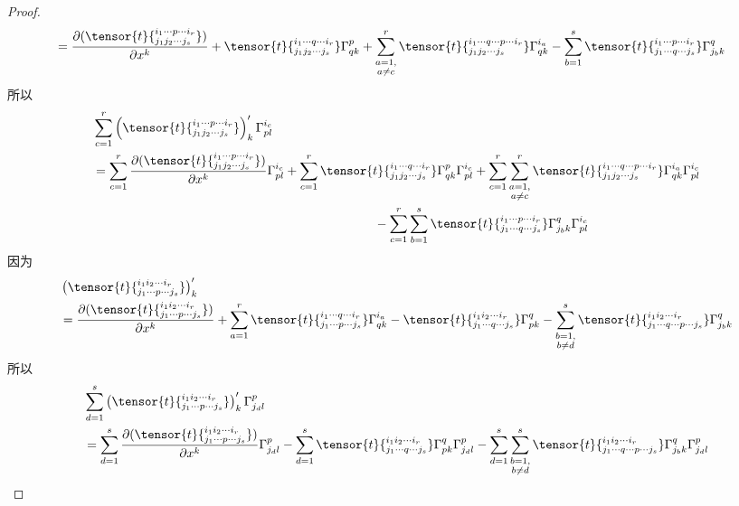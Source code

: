 \begin{proof}
\[\begin{split}
	&=\frac{{\partial}(\tensor{t}{^{i_{1}\cdots p\cdots i_{r}}_{j_{1}j_{2}\cdots j_{s}}} )}{\partial x^{k}}+\tensor{t}{^{i_{1}\cdots q\cdots i_{r}}_{j_{1}j_{2}\cdots j_{s}}} \Gamma_{qk}^{p}+\sum_{\substack{a=1,\\ a\neq c}}^{r}\tensor{t}{^{i_{1}\cdots q\cdots p\cdots i_{r}}_{j_{1}j_{2}\cdots j_{s}}}\Gamma_{qk}^{i_{a}}-\sum_{b=1}^{s}\tensor{t}{^{i_{1}\cdots p\cdots i_{r}}_{j_{1}\cdots q\cdots j_{s}}}\Gamma_{j_{b}k}^{q}
\end{split}
\]
所以
\[
\begin{split}
	&\sum_{c=1}^{r}\left( \tensor{t}{^{i_{1}\cdots p\cdots i_{r}}_{j_{1}j_{2}\cdots j_{s}}} \right)^{\prime}_{k} \Gamma_{pl}^{i_{c}}\\
	&=\sum_{c=1}^{r}\frac{{\partial}(\tensor{t}{^{i_{1}\cdots p\cdots i_{r}}_{j_{1}j_{2}\cdots j_{s}}} )}{\partial x^{k}}\Gamma_{pl}^{i_{c}}+\sum_{c=1}^{r}\tensor{t}{^{i_{1}\cdots q\cdots i_{r}}_{j_{1}j_{2}\cdots j_{s}}} \Gamma_{qk}^{p}\Gamma_{pl}^{i_{c}}+\sum_{c=1}^{r}\sum_{\substack{a=1,\\ a\neq c}}^{r}\tensor{t}{^{i_{1}\cdots q\cdots p\cdots i_{r}}_{j_{1}j_{2}\cdots j_{s}}}\Gamma_{qk}^{i_{a}}\Gamma_{pl}^{i_{c}}\\
	&\;\quad\quad\quad\quad\quad\quad\quad\quad\quad\quad\quad\quad\quad\quad\quad\quad\quad\quad\quad\quad\quad\quad-\sum_{c=1}^{r}\sum_{b=1}^{s}\tensor{t}{^{i_{1}\cdots p\cdots i_{r}}_{j_{1}\cdots q\cdots j_{s}}}\Gamma_{j_{b}k}^{q}  \Gamma_{pl}^{i_{c}}
\end{split}
\]
因为
\[
\begin{split}
	&\left( \tensor{t}{^{i_{1}i_{2}\cdots  i_{r}}_{j_{1}\cdots p\cdots j_{s}}} \right)^{\prime}_{k}\\
	&=\frac{{\partial}( \tensor{t}{^{i_{1}i_{2}\cdots  i_{r}}_{j_{1}\cdots p\cdots j_{s}}})}{\partial x^{k}}+\sum_{a=1}^{r} \tensor{t}{^{i_{1}\cdots q \cdots i_{r}}_{j_{1}\cdots p\cdots j_{s}}}\Gamma_{qk}^{i_{a}}-\tensor{t}{^{i_{1}i_{2}\cdots  i_{r}}_{j_{1}\cdots q\cdots j_{s}}} \Gamma_{pk}^{q}-\sum_{\substack{b=1,\\ b\neq d}}^{s}\tensor{t}{^{i_{1}i_{2}\cdots  i_{r}}_{j_{1}\cdots q\cdots p\cdots j_{s}}}\Gamma_{j_{b}k}^{q}
\end{split}
\]
所以
\[
\begin{split}
	&\sum_{d=1}^{s}\left( \tensor{t}{^{i_{1}i_{2}\cdots i_{r}}_{j_{1}\cdots p\cdots  j_{s}}} \right)^{\prime}_{k} \Gamma_{j_{d}l}^{p}\\
	&=\sum_{d=1}^{s}\frac{{\partial}( \tensor{t}{^{i_{1}i_{2}\cdots  i_{r}}_{j_{1}\cdots p\cdots j_{s}}})}{\partial x^{k}}\Gamma_{j_{d}l}^{p}-\sum_{d=1}^{s}\tensor{t}{^{i_{1}i_{2}\cdots  i_{r}}_{j_{1}\cdots q\cdots j_{s}}} \Gamma_{pk}^{q}\Gamma_{j_{d}l}^{p}-\sum_{d=1}^{s}\sum_{\substack{b=1,\\ b\neq d}}^{s}\tensor{t}{^{i_{1}i_{2}\cdots  i_{r}}_{j_{1}\cdots q\cdots p\cdots j_{s}}}\Gamma_{j_{b}k}^{q}\Gamma_{j_{d}l}^{p}\\

\end{split}\]
\end{proof}
